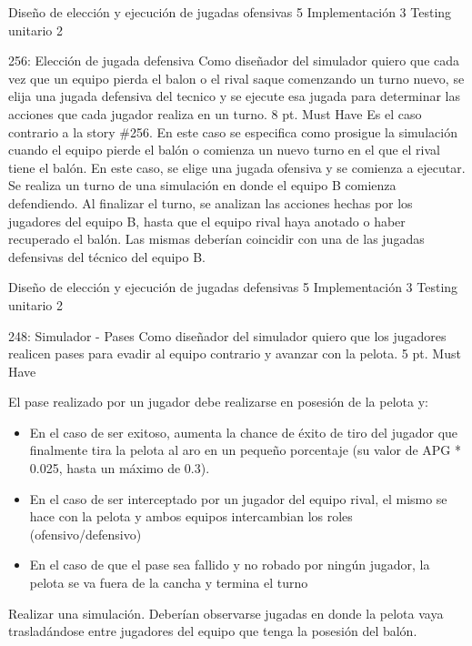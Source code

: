 \begin{taskstable}
 \task
 {Diseño de elección y ejecución de jugadas ofensivas}
 {5}
 \task
 {Implementación}
 {3}
 \task
 {Testing unitario}
 {2}
\end{taskstable}

\vspace{1cm}


\sprintstory
{256: Elección de jugada defensiva}
{Como diseñador del simulador quiero que cada vez que un equipo pierda el balon o el rival saque comenzando un turno nuevo, se elija una jugada defensiva del tecnico y se ejecute esa jugada para determinar las acciones que cada jugador realiza en un turno.}
{8 pt.}
{Must Have}
{Es el caso contrario a la story \#256. En este caso se especifica como prosigue la simulación cuando el equipo pierde el balón o comienza un nuevo turno en
el que el rival tiene el balón. En este caso, se elige una jugada ofensiva y se comienza a ejecutar.}
{Se realiza un turno de una simulación en donde el equipo B comienza defendiendo. Al finalizar el turno, se analizan las acciones
hechas por los jugadores del equipo B, hasta que el equipo rival haya anotado o haber recuperado el balón. Las mismas deberían coincidir con una de las jugadas defensivas del técnico del equipo B.  }

\begin{taskstable}
 \task
 {Diseño de elección y ejecución de jugadas defensivas}
 {5}
 \task
 {Implementación}
 {3}
 \task
 {Testing unitario}
 {2}
\end{taskstable}

\vspace{1cm}


\sprintstory
{248: Simulador - Pases}
{ Como diseñador del simulador quiero que los jugadores realicen pases para evadir al equipo contrario y avanzar con la pelota.}
{5 pt.}
{Must Have}
{El pase realizado por un jugador debe realizarse en posesión de la pelota y:
\begin{itemize}
	\item En el caso de ser exitoso, aumenta la chance de éxito de tiro del jugador que finalmente tira la pelota al aro en un pequeño porcentaje (su valor de APG * 0.025, hasta un máximo de 0.3).
	\item En el caso de ser interceptado por un jugador del equipo rival, el mismo se hace con la pelota y ambos equipos intercambian los roles (ofensivo/defensivo)
	\item En el caso de que el pase sea fallido y no robado por ningún jugador, la pelota se va fuera de la cancha y termina el turno
\end{itemize}}
{Realizar una simulación. Deberían observarse jugadas en donde la pelota vaya trasladándose entre jugadores del equipo que tenga la posesión del balón.}

